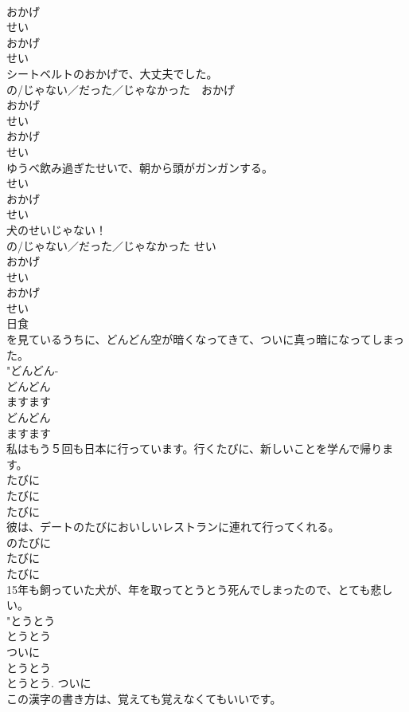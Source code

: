 \documentclass[8pt]{extreport}
\begin{document}
\begin{CJK}{UTF8}{min}
{{\\	おかげ 
\\	せい 
\\	おかげ 
\\	せい 
\\	シートベルトのおかげで、大丈夫でした。	
\\	{の/じゃない／だった／じゃなかった}　おかげ 
\\	おかげ 
\\	せい 
\\	おかげ 
\\	せい 
\\	ゆうべ飲み過ぎたせいで、朝から頭がガンガンする。	
\\	せい 
\\	おかげ 
\\	せい 
\\	犬のせいじゃない！	
\\	{の/じゃない／だった／じゃなかった} せい 
\\	おかげ 
\\	せい 
\\	おかげ 
\\	せい 
\\	日食
\\	を見ているうちに、どんどん空が暗くなってきて、ついに真っ暗になってしまった。	
\\	"どんどん-
\\	どんどん 
\\	ますます
\\	どんどん 
\\	ますます 
\\	私はもう５回も日本に行っています。行くたびに、新しいことを学んで帰ります。	
\\	たびに 
\\	たびに 
\\	たびに 
\\	彼は、デートのたびにおいしいレストランに連れて行ってくれる。	
\\	のたびに 
\\	たびに 
\\	たびに 
\\	15年も飼っていた犬が、年を取ってとうとう死んでしまったので、とても悲しい。	
\\	"とうとう 
\\	とうとう 
\\	ついに 
\\	とうとう 
\\	とうとう. ついに 
\\	この漢字の書き方は、覚えても覚えなくてもいいです。	
}}
\end{CJK}
\end{document}
